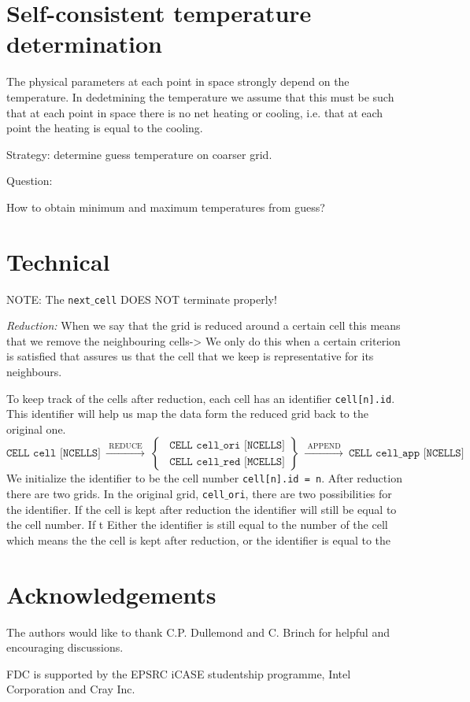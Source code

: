 \documentclass[]{article}
\begin{document}
\section{Self-consistent temperature determination}

The physical parameters at each point in space strongly depend on the temperature.
In dedetmining the temperature we assume that this must be such that at each point in space there is no net heating or cooling, i.e. that at each point the heating is equal to the cooling.

\bigskip

Strategy: determine guess temperature on coarser grid.

\bigskip

Question:

How to obtain minimum and maximum temperatures from guess?





\section{Technical}


NOTE: The \texttt{next$\_$cell} DOES NOT terminate properly!

\bigskip

\emph{Reduction:} When we say that the grid is reduced around a certain cell this means that we remove the neighbouring cells-> We only do this when a certain criterion is satisfied that assures us that the cell that we keep is representative for its neighbours.

\bigskip

To keep track of the cells after reduction, each cell has an identifier \texttt{cell[n].id}. This identifier will help us map the data form the reduced grid back to the original one.
\begin{equation*}
  \texttt{CELL cell [NCELLS]}
  \ \xrightarrow{\text{ REDUCE }} \ \left.
  \begin{cases}
    \ \ \texttt{CELL cell$\_$ori [NCELLS]} \\
    \ \ \texttt{CELL cell$\_$red [MCELLS]}
  \end{cases}
  \right\} \ \xrightarrow{\text{ APPEND }} \
  \texttt{CELL cell$\_$app [NCELLS]}
\end{equation*}
We initialize the identifier to be the cell number \texttt{cell[n].id = n}. After reduction there are two grids. In the original grid, \texttt{cell$\_$ori}, there are two possibilities for the identifier. If the cell is kept after reduction the identifier will still be equal to the cell number. If t Either the identifier is still equal to the number of the cell which means the the cell is kept after reduction, or the identifier is equal to the


\section*{Acknowledgements}
The authors would like to thank C.P. Dullemond and C. Brinch for helpful and encouraging discussions.

FDC is supported by the EPSRC iCASE studentship programme, Intel Corporation and Cray Inc.





\end{document}
